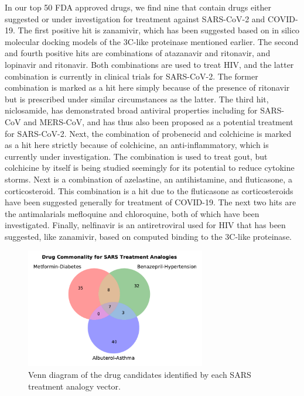 \documentclass{article}
\begin{document}
In our top 50 FDA approved drugs, we find nine that contain drugs either suggested or under investigation for treatment against SARS-CoV-2 and COVID-19.
The first positive hit is zanamivir, which has been suggested based on in silico molecular docking models of the 3C-like proteinase mentioned earlier.
The second and fourth positive hits are combinations of atazanavir and ritonavir, and lopinavir and ritonavir.
Both combinations are used to treat HIV, and the latter combination is currently in clinical trials for SARS-CoV-2\cite{cao2020trial}.
The former combination is marked as a hit here simply because of the presence of ritonavir but is prescribed under similar circumstances as the latter.
The third hit, niclosamide, has demonstrated broad antiviral properties including for SARS-CoV and MERS-CoV, and has thus also been proposed as a potential treatment for SARS-CoV-2\cite{xu2020broad}.
Next, the combination of probenecid and colchicine is marked as a hit here strictly because of colchicine, an anti-inflammatory, which is currently under investigation\cite{colcorona}.
The combination is used to treat gout, but colchicine by itself is being studied seemingly for its potential to reduce cytokine storms.
Next is a combination of azelastine, an antihistamine, and fluticasone, a corticosteroid.
This combination is a hit due to the fluticasone as corticosteroids have been suggested generally for treatment of COVID-19\cite{mccreary2020coronavirus}.
The next two hits are the antimalarials mefloquine and chloroquine, both of which have been investigated\cite{Weston2020.03.25.008482,wang2020remdesivir}.
Finally, nelfinavir is an antiretroviral used for HIV that has been suggested, like zanamivir, based on computed binding to the 3C-like proteinase.


\begin{figure}
\centering
\includegraphics[width=0.7\textwidth]{drugvenn}
\caption{Venn diagram of the drug candidates identified by each SARS treatment analogy vector.}
\label{fig:drug_venn}
\end{figure}
\end{document}
